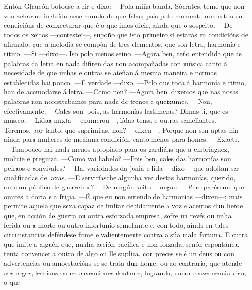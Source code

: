 \begin{multicols}{3}
\setlength{\columnseprule}{1pt}
{\small

\noindent
Entón Glaucón botouse a rir e dixo:
\noindent
---Pola miña banda, Sócrates, temo que non vou acharme incluído nese
mundo de que falas; pois polo momento non estou en condicións de
conxecturar que é o que imos dicir, aínda que o sospeito.
\noindent
---De todos os xeitos ---contestei---, supoño que isto primeiro si
estarás en condicións de afirmalo: que a melodía se compón de tres
elementos, que son letra, harmonía e ritmo.
\noindent
---Si ---dixo---. Iso polo menos seino.
\noindent
---Agora ben, teño entendido que as palabras da letra en nada difiren
das non acompañadas con música canto á necesidade de que unhas e outras
se ateñan á mesma maneira e normas establecidas hai pouco.
\noindent
---É verdade ---dixo.
\noindent
---Polo que toca á harmonía e ritmo, han de acomodarse á letra.
\noindent
---Como non?
\noindent
---Agora ben, dixemos que nas nosas palabras non necesitabamos para nada
de trenos e queixumes.
\noindent
---Non, efectivamente.
\noindent
---Cales son, pois, as harmonías lastimeras? Dimas ti, que es músico.
\noindent
---Lídaa mixta ---enumerou---, lídaa tensa e outras semellantes.
\noindent
---Teremos, por tanto, que suprimilas, non? ---dixen---. Porque non son
aptas nin aínda para mulleres de mediana condición, canto menos para
homes.
\noindent
---Exacto.
\noindent
---Tampouco hai nada menos apropiado para os gardiáns que a embriaguez,
molicie e preguiza.
\noindent
---Como vai habelo?
\noindent
---Pois ben, cales das harmonías son peiraos e convivales?
\noindent
---Hai variedades da jonia e lida ---dixo--- que adoitan ser
cualificadas de laxas.
\noindent
---E serviríasche algunha vez destas harmonías, querido, ante un público
de guerreiros?
\noindent
---De ningún xeito ---negou---. Pero paréceme que omites a doria e a
frigia.
\noindent
---É que eu non entendo de harmonías ---dixen---; mais permite aquela
que sexa capaz de imitar debidamente a voz e acentos dun heroe que, en
acción de guerra ou outra esforzada empresa, sofre un revés ou unha
ferida ou a morte ou outro infortunio semellante e, con todo, aínda en
tales circunstancias deféndese firme e valientemente contra a súa mala
fortuna. E outra que imite a alguén que, nunha acción pacífica e non
forzada, senón espontánea, tenta convencer a outro de algo ou lle
suplica, con preces se é un deus ou con advertencias ou amoestacións se
se trata dun home; ou ao contrario, que atende aos rogos, leccións ou
reconvenciones doutro e, logrando, como consecuencia diso, o que
}
\end{multicols}
